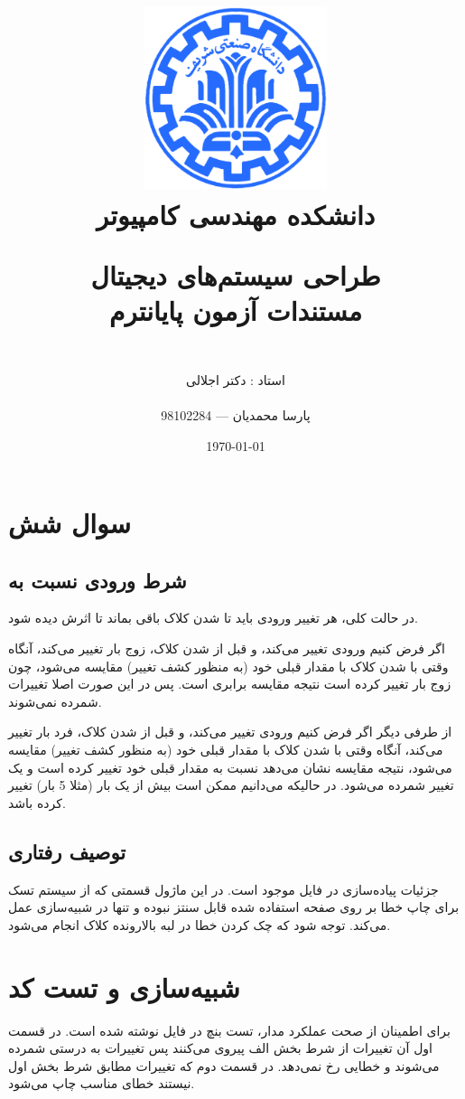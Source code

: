 \documentclass[fleqn]{article}
\title{
\includegraphics[width=0.4\textwidth]{sharif.png}\\
\normalsize{دانشکده مهندسی کامپیوتر}\\
\vspace{1cm}
	
\huge{طراحی سیستم‌های دیجیتال}
\\
\Large{مستندات آزمون پایانترم}
\\
}
\author{
\\
استاد : دکتر اجلالی
\\
\\
پارسا محمدیان --- 98102284
}
\date{\today}
\begin{document}
\clearpage\maketitle
\thispagestyle{empty}

\newpage

\pagestyle{fancy}


\tableofcontents

\setcounter{page}{1}

\newpage

\section{}
\section{سوال شش}
\subsection{شرط ورودی  نسبت به }
در حالت کلی، هر تغییر ورودی 
باید تا 
شدن کلاک باقی بماند تا اثرش دیده شود. 

اگر فرض کنیم ورودی 
تغییر می‌کند، و قبل از 
شدن کلاک، زوج بار تغییر می‌کند، آنگاه وقتی با 
شدن کلاک با مقدار قبلی خود (به منظور کشف تغییر) مقایسه می‌شود، چون زوج بار تغییر کرده است نتیجه مقایسه برابری 
است. پس در این صورت اصلا تغییرات شمرده نمی‌شوند. 

از طرفی دیگر اگر فرض کنیم ورودی 
تغییر می‌کند، و قبل از 
شدن کلاک، فرد بار تغییر می‌کند، آنگاه وقتی با 
شدن کلاک با مقدار قبلی خود (به منظور کشف تغییر) مقایسه می‌شود، نتیجه مقایسه نشان می‌دهد نسبت به مقدار قبلی خود 
تغییر کرده است و یک تغییر شمرده می‌شود. در حالیکه می‌دانیم ممکن است بیش از یک بار (مثلا 5 بار) تغییر کرده باشد.

\subsection{توصیف رفتاری}
جزئیات پیاده‌سازی در فایل 
موجود است. در این ماژول قسمتی که از سیستم تسک برای چاپ خطا بر روی صفحه استفاده شده قابل سنتز نبوده و 
تنها در شبیه‌سازی عمل می‌کند. توجه شود که چک کردن خطا در لبه بالارونده کلاک انجام می‌شود. 

\section{شبیه‌سازی و تست کد}
برای اطمینان از صحت عملکرد مدار، تست بنچ در فایل 
نوشته شده است. در قسمت اول آن تغییرات از شرط بخش الف پیروی می‌کنند پس تغییرات به درستی شمرده می‌شوند و 
خطایی رخ نمی‌دهد. در قسمت دوم که تغییرات مطابق شرط بخش اول نیستند خطای مناسب چاپ می‌شود. 
\end{document}
